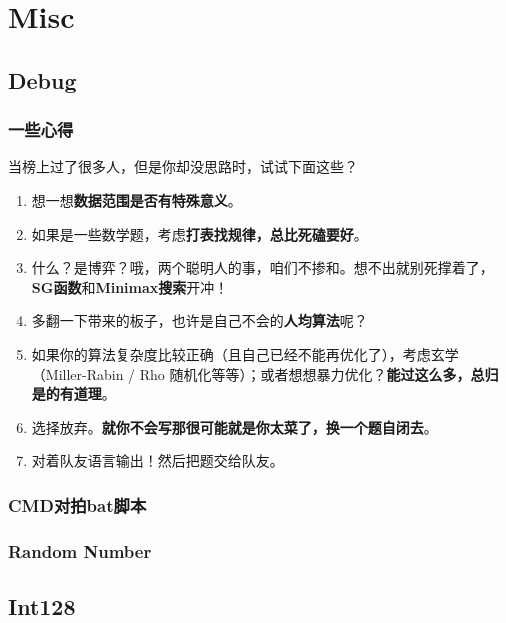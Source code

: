 \chapter{Misc}
\section{Debug}
\subsection{一些心得}
当榜上过了很多人，但是你却没思路时，试试下面这些？
\begin{enumerate}\setlength{\itemsep}{-0.1cm}
  \item 想一想{\textbf{数据范围是否有特殊意义}}。
  \item 如果是一些数学题，考虑{\textbf{打表找规律，总比死磕要好}}。
  \item 什么？是博弈？哦，两个聪明人的事，咱们不掺和。想不出就别死撑着了，{\textbf{SG函数}和\textbf{Minimax搜索}}开冲！
  \item 多翻一下带来的板子，也许是自己不会的{\textbf{人均算法}}呢？
  \item 如果你的算法复杂度比较正确（且自己已经不能再优化了），考虑玄学（Miller-Rabin / Rho 随机化等等）；或者想想暴力优化？{\textbf{能过这么多，总归是的有道理}}。
  \item 选择放弃。{\textbf{就你不会写那很可能就是你太菜了，换一个题自闭去}}。
  \item 对着队友语言输出！然后把题交给队友。
\end{enumerate}

\subsection{CMD对拍bat脚本}

\subsection{Random Number}

\section{Int128}
